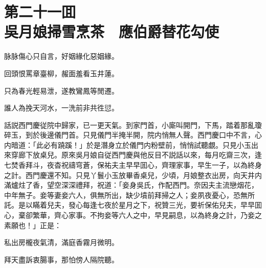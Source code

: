 
\chapter*{第二十一囬　\\吳月娘掃雪烹茶　應伯爵替花勾使}


\begin{myquote}
脉脉傷心只自言，好姻緣化惡姻緣。

回頭恨罵章臺柳，赧面羞看玉井蓮。

只為春光輕易泄，遂教鸞鳳等閒遷。

誰人為挽天河水，一洗前非共徃愆。
\end{myquote}

話説西門慶従院中歸家，已一更天氣。到家門首，小廝叫開門，下馬，踏着那亂瓊碎玉，到於後邊儀門首。只見儀門半掩半開，院内悄無人聲。西門慶口中不言，心内暗道：「此必有蹺蹊！」於是潛身立於儀門内粉壁前，悄悄試聽覷。只見小玉出來穿廊下放桌兒。原來吳月娘自従西門慶與他反目不説話以來，每月吃齋三次，逢七焚香拜斗，夜杳祝禱穹蒼，保祐夫主早早囬心，齊理家事，早生一子，以為終身之計。西門慶還不知。只見丫鬟小玉放畢香桌兒，少頃，月娘整衣出房，向天井内滿爐炷了香，望空深深禮拜，祝道：「妾身吳氏，作配西門。奈因夫主流戀烟花，中年無子。妾等妻妾六人，俱無所出，缺少墳前拜掃之人；妾夙夜憂心，恐無所託。是以瞞着兒夫，發心每逢七夜於星月之下，祝贊三光，要祈保佑兒夫，早早囬心，棄卻繁華，齊心家事。不拘妾等六人之中，早見嗣息，以為終身之計，乃妾之素願也！」正是：

\begin{myquote}
私出房櫳夜氣清，滿庭香霧月微明。

拜天盡訴衷腸事，那怕傍人隔院聽。
\end{myquote}

